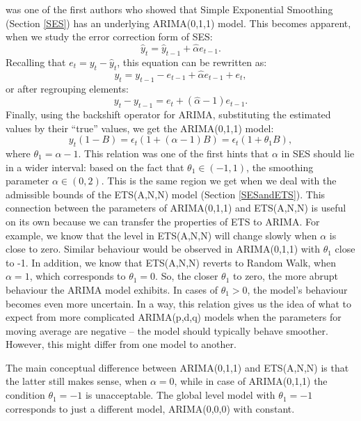 \documentclass[
]{book}
\theoremstyle{definition}
\theoremstyle{definition}
\theoremstyle{definition}
\theoremstyle{definition}
\theoremstyle{remark}
\begin{document}
\citet{Muth1960} was one of the first authors who showed that Simple Exponential Smoothing (Section \ref{SES}) has an underlying ARIMA(0,1,1) model. This becomes apparent, when we study the error correction form of SES:
\begin{equation*}
  \hat{y}_{t} = \hat{y}_{t-1} + \hat{\alpha} e_{t-1}.
\end{equation*}
Recalling that \(e_t=y_t-\hat{y}_t\), this equation can be rewritten as:
\begin{equation*}
  y_{t} = y_{t-1} -e_{t-1} + \hat{\alpha} e_{t-1} + e_t,
\end{equation*}
or after regrouping elements:
\begin{equation*}
  y_{t} -y_{t-1} = e_t + (\hat{\alpha} -1) e_{t-1}.
\end{equation*}
Finally, using the backshift operator for ARIMA, substituting the estimated values by their ``true'' values, we get the ARIMA(0,1,1) model:
\begin{equation*}
  y_{t}(1 -B) = \epsilon_t(1 + (\alpha -1) B) = \epsilon_t(1 + \theta_1 B),
\end{equation*}
where \(\theta_1 = \alpha-1\). This relation was one of the first hints that \(\alpha\) in SES should lie in a wider interval: based on the fact that \(\theta_1 \in (-1, 1)\), the smoothing parameter \(\alpha \in (0, 2)\). This is the same region we get when we deal with the admissible bounds of the ETS(A,N,N) model (Section \ref{SESandETS}). This connection between the parameters of ARIMA(0,1,1) and ETS(A,N,N) is useful on its own because we can transfer the properties of ETS to ARIMA. For example, we know that the level in ETS(A,N,N) will change slowly when \(\alpha\) is close to zero. Similar behaviour would be observed in ARIMA(0,1,1) with \(\theta_1\) close to -1. In addition, we know that ETS(A,N,N) reverts to Random Walk, when \(\alpha=1\), which corresponds to \(\theta_1=0\). So, the closer \(\theta_1\) to zero, the more abrupt behaviour the ARIMA model exhibits. In cases of \(\theta_1>0\), the model's behaviour becomes even more uncertain. In a way, this relation gives us the idea of what to expect from more complicated ARIMA(p,d,q) models when the parameters for moving average are negative -- the model should typically behave smoother. However, this might differ from one model to another.

The main conceptual difference between ARIMA(0,1,1) and ETS(A,N,N) is that the latter still makes sense, when \(\alpha=0\), while in case of ARIMA(0,1,1) the condition \(\theta_1=-1\) is unacceptable. The global level model with \(\theta_1=-1\) corresponds to just a different model, ARIMA(0,0,0) with constant.
\end{document}
